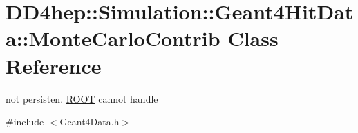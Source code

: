 \hypertarget{class_d_d4hep_1_1_simulation_1_1_geant4_hit_data_1_1_monte_carlo_contrib}{}\section{D\+D4hep\+:\+:Simulation\+:\+:Geant4\+Hit\+Data\+:\+:Monte\+Carlo\+Contrib Class Reference}
\label{class_d_d4hep_1_1_simulation_1_1_geant4_hit_data_1_1_monte_carlo_contrib}


not persisten. \hyperlink{namespace_r_o_o_t}{R\+O\+OT} cannot handle  




{\ttfamily \#include $<$Geant4\+Data.\+h$>$}

